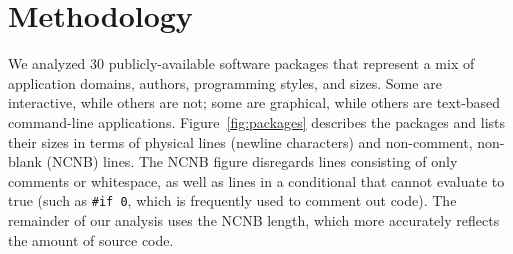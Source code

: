 \documentclass[10pt]{article}
\def\numpackages{30}
\begin{document}



%

%
%
%






\section{Methodology}
\label{sec:methodology}

We analyzed {\numpackages} publicly-available software packages that
represent a mix of application domains, authors, programming styles, and
sizes.  Some are interactive, while others are not; some are graphical,
while others are text-based command-line applications.
Figure~\ref{fig:packages} describes the packages and lists their sizes in
terms of physical lines (newline characters) and non-comment, non-blank
(NCNB) lines.  The NCNB figure disregards lines consisting of only comments
or whitespace, as well as lines in a conditional that cannot evaluate to
true (such as {\tt \#if 0}, which is frequently used to comment out code).
The remainder of our analysis uses the NCNB length, which more accurately
reflects the amount of source code.
\end{document}
